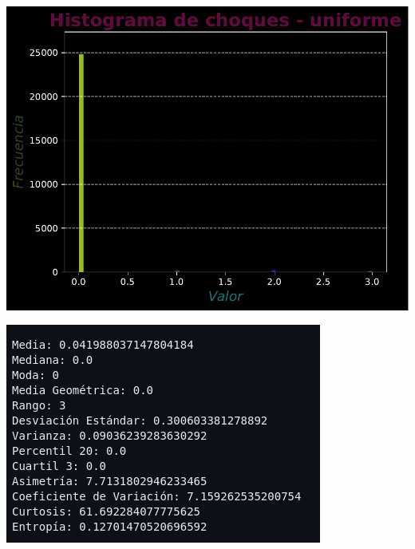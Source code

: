 \documentclass[11pt]{article} %
\begin{document}
	 \begin{multicols}{2}
	 	\begin{minipage}{\linewidth}
	 		\centering
	 		\includegraphics[width=1\linewidth]{hist_choques_uniforme.pdf}
	 		\label{fig:chUnifHist}
	 	\end{minipage}
	 	\vfill\columnbreak
	 	\begin{minipage}{\linewidth}
	 		\centering
	 		\includegraphics[width=1\linewidth]{u4.png}%
	 		\label{chUnifMet}
	 	\end{minipage}
	 \end{multicols}
	 
\end{document}
